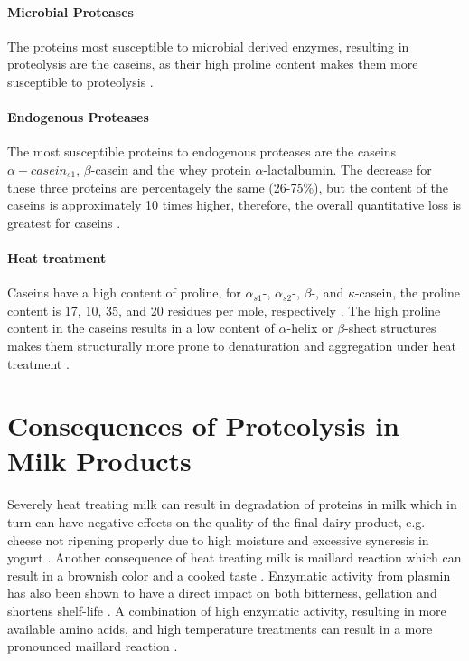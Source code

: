 \paragraph*{Microbial Proteases}
    The proteins most susceptible to microbial derived enzymes, resulting in proteolysis are the caseins, as their high proline content makes them more susceptible to proteolysis \cite*{b03_milk_proteins}.

\paragraph*{Endogenous Proteases}
The most susceptible proteins to endogenous proteases are the caseins $\alpha-casein_{s1}$, $\beta$-casein and the whey protein $\alpha$-lactalbumin. The decrease for these three proteins are percentagely the same (26-75\%), but the content of the caseins is approximately 10 times higher, therefore, the overall quantitative loss is greatest for caseins \cite*{s05_mastitis_complex}.


\paragraph*{Heat treatment}
Caseins have a high content of proline, for $\alpha_{s1}$-, $\alpha_{s2}$-, $\beta$-, and $\kappa$-casein, the proline content is 17, 10, 35, and 20 residues per mole, respectively \cite*{b03_milk_proteins}. The high proline content in the caseins results in a low content of $\alpha$-helix or $\beta$-sheet structures makes them structurally more prone to denaturation and aggregation under heat treatment \cite*{b03_milk_proteins}.


\section{Consequences of Proteolysis in Milk Products}
Severely heat treating milk can result in degradation of proteins in milk which in turn can have negative effects on the quality of the final dairy product, e.g. cheese not ripening properly due to high moisture and excessive syneresis in yogurt   \cite*{b02_heat_induced_changes_in_milk}. Another consequence of heat treating milk is maillard reaction which can result in a brownish color and a cooked taste \cite*{a08_shelf_life_of_heat_treated_dairy_products}. Enzymatic activity from plasmin has also been shown to have a direct impact on both bitterness, gellation and shortens shelf-life \cite*{a08_shelf_life_of_heat_treated_dairy_products}. A combination of high enzymatic activity, resulting in more available amino acids, and high temperature treatments can result in a more pronounced maillard reaction \cite*{a08_shelf_life_of_heat_treated_dairy_products}.

